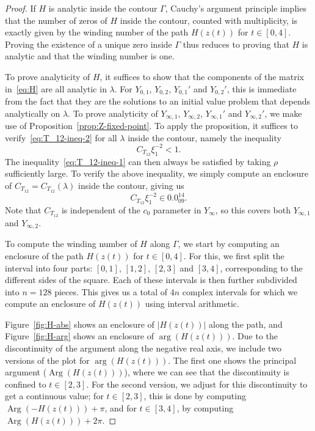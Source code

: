 \documentclass[11pt]{article}
\newcommand{\codenumber}[1]{#1}
\newcommand{\resultnumber}[1]{#1}
\begin{document}
\begin{proof}
  If \(H\) is analytic inside the contour \(\Gamma\), Cauchy's
  argument principle implies that the number of zeros of \(H\) inside
  the contour, counted with multiplicity, is exactly given by the
  winding number of the path \(H(z(t))\) for \(t \in [0, 4]\). Proving
  the existence of a unique zero inside \(\Gamma\) thus reduces to
  proving that \(H\) is analytic and that the winding number is one.

  To prove analyticity of \(H\), it suffices to show that the
  components of the matrix in~\eqref{eq:H} are all analytic in
  \(\lambda\). For \(Y_{0,1}\), \(Y_{0,2}\), \(Y_{0,1}'\) and
  \(Y_{0,2}'\), this is immediate from the fact that they are the
  solutions to an initial value problem that depends analytically on
  \(\lambda\). To prove analyticity of \(Y_{\infty,1}\),
  \(Y_{\infty,2}\), \(Y_{\infty,1}'\) and \(Y_{\infty,2}'\), we make
  use of Proposition~\ref{prop:Z-fixed-point}. To apply the
  proposition, it suffices to verify~\eqref{eq:T_12-ineq-2} for all
  \(\lambda\) inside the contour, namely the inequality
  \begin{equation*}
    C_{T_{12}}\xi_{1}^{-2} < 1.
  \end{equation*}
  The inequality~\eqref{eq:T_12-ineq-1} can then always be satisfied
  by taking \(\rho\) sufficiently large. To verify the above
  inequality, we simply compute an enclosure of
  \(C_{T_{12}} = C_{T_{12}}(\lambda)\) inside the contour, giving us
  \begin{equation*}
    C_{T_{12}}\xi_{1}^{-2} \in \resultnumber{0.0_{09}^{14}}.
  \end{equation*}
  Note that \(C_{T_{12}}\) is independent of the \(c_{0}\) parameter
  in \(Y_{\infty}\), so this covers both \(Y_{\infty,1}\) and
  \(Y_{\infty,2}\).

  To compute the winding number of \(H\) along \(\Gamma\), we start by
  computing an enclosure of the path \(H(z(t))\) for \(t \in [0, 4]\).
  For this, we first split the interval into four parts: \([0, 1]\),
  \([1, 2]\), \([2, 3]\) and \([3, 4]\), corresponding to the
  different sides of the square. Each of these intervals is then
  further subdivided into \(n = \codenumber{128}\) pieces. This gives
  us a total of \(4n\) complex intervals for which we compute an
  enclosure of \(H(z(t))\) using interval arithmetic.

  Figure~\ref{fig:H-abs} shows an enclosure of \(|H(z(t))|\) along the
  path, and Figure~\ref{fig:H-arg} shows an enclosure of
  \(\arg(H(z(t)))\). Due to the discontinuity of the argument along
  the negative real axis, we include two versions of the plot for
  \(\arg(H(z(t)))\). The first one shows the principal argument
  (\(\operatorname{Arg}(H(z(t)))\)), where we can see that the
  discontinuity is confined to \(t \in [2, 3]\). For the second
  version, we adjust for this discontinuity to get a continuous value;
  for \(t \in [2, 3]\), this is done by computing
  \(\operatorname{Arg}(-H(z(t))) + \pi\), and for \(t \in [3, 4]\), by
  computing \(\operatorname{Arg}(H(z(t))) + 2\pi\).


\end{proof}
\end{document}
